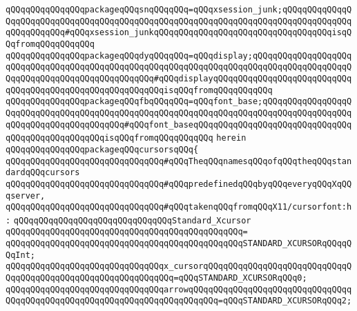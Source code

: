\verb|qQQqqQQqqQQqqQQqpackageqQQqsnqQQqqQQq=qQQqxsession_junk;qQQqqQQqqQQqqQQqqQQqqQQqqQQqqQQqqQQqqQQqqQQqqQQqqQQqqQQqqQQqqQQqqQQqqQQqqQQqqQQqqQQqqQQqqQQqqQQq#qQQqxsession_junkqQQqqQQqqQQqqQQqqQQqqQQqqQQqqQQqqQQqisqQQqfromqQQqqQQqqQQq|\newline
\verb|qQQqqQQqqQQqqQQqpackageqQQqdyqQQqqQQq=qQQqdisplay;qQQqqQQqqQQqqQQqqQQqqQQqqQQqqQQqqQQqqQQqqQQqqQQqqQQqqQQqqQQqqQQqqQQqqQQqqQQqqQQqqQQqqQQqqQQqqQQqqQQqqQQqqQQqqQQqqQQqqQQq#qQQqdisplayqQQqqQQqqQQqqQQqqQQqqQQqqQQqqQQqqQQqqQQqqQQqqQQqqQQqqQQqqQQqisqQQqfromqQQqqQQqqQQq|\newline
\verb|qQQqqQQqqQQqqQQqpackageqQQqfbqQQqqQQq=qQQqfont_base;qQQqqQQqqQQqqQQqqQQqqQQqqQQqqQQqqQQqqQQqqQQqqQQqqQQqqQQqqQQqqQQqqQQqqQQqqQQqqQQqqQQqqQQqqQQqqQQqqQQqqQQqqQQqqQQq#qQQqfont_baseqQQqqQQqqQQqqQQqqQQqqQQqqQQqqQQqqQQqqQQqqQQqqQQqqQQqisqQQqfromqQQqqQQqqQQq|\newline
\verb|herein|\newline
\newline
\verb|qQQqqQQqqQQqqQQqpackageqQQqcursorsqQQq{|\newline
\newline
\verb|qQQqqQQqqQQqqQQqqQQqqQQqqQQqqQQq#qQQqTheqQQqnamesqQQqofqQQqtheqQQqstandardqQQqcursors|\newline
\verb|qQQqqQQqqQQqqQQqqQQqqQQqqQQqqQQq#qQQqpredefinedqQQqbyqQQqeveryqQQqXqQQqserver,|\newline
\verb|qQQqqQQqqQQqqQQqqQQqqQQqqQQqqQQq#qQQqtakenqQQqfromqQQqX11/cursorfont:h:|\newline
\newline
\verb|qQQqqQQqqQQqqQQqqQQqqQQqqQQqqQQqStandard_Xcursor|\newline
\verb|qQQqqQQqqQQqqQQqqQQqqQQqqQQqqQQqqQQqqQQqqQQqqQQq=|\newline
\verb|qQQqqQQqqQQqqQQqqQQqqQQqqQQqqQQqqQQqqQQqqQQqqQQqSTANDARD_XCURSORqQQqqQQqInt;|\newline
\newline
\verb|qQQqqQQqqQQqqQQqqQQqqQQqqQQqqQQqx_cursorqQQqqQQqqQQqqQQqqQQqqQQqqQQqqQQqqQQqqQQqqQQqqQQqqQQqqQQqqQQqqQQq=qQQqSTANDARD_XCURSORqQQq0;|\newline
\verb|qQQqqQQqqQQqqQQqqQQqqQQqqQQqqQQqarrowqQQqqQQqqQQqqQQqqQQqqQQqqQQqqQQqqQQqqQQqqQQqqQQqqQQqqQQqqQQqqQQqqQQqqQQqqQQq=qQQqSTANDARD_XCURSORqQQq2;|\newline
